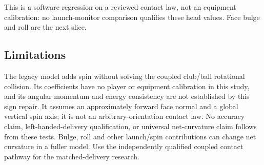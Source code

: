 \documentclass[
]{article}
\begin{document}
This is a software regression on a reviewed contact law, not an
equipment calibration: no launch-monitor comparison qualifies these head
values. Face bulge and roll are the next slice.

\subsection{Limitations}\label{limitations}

The legacy model adds spin without solving the coupled club/ball
rotational collision. Its coefficients have no player or equipment
calibration in this study, and its angular momentum and energy
consistency are not established by this sign repair. It assumes an
approximately forward face normal and a global vertical spin axis; it is
not an arbitrary-orientation contact law. No accuracy claim,
left-handed-delivery qualification, or universal net-curvature claim
follows from these tests. Bulge, roll and other launch/spin
contributions can change net curvature in a fuller model. Use the
independently qualified coupled contact pathway for the matched-delivery
research.
\end{document}
